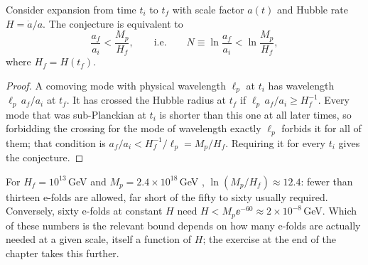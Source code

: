 \begin{proposition}\label{prop:swampland:efolds}
Consider expansion from time $t_i$ to $t_f$ with scale factor $a(t)$ and Hubble rate $H=\dot a/a$.
The conjecture is equivalent to
\begin{equation}\label{eq:swampland:tcc}
\frac{a_f}{a_i}<\frac{M_p}{H_f},\qquad\text{i.e.}\qquad
N\equiv\ln\frac{a_f}{a_i}<\ln\frac{M_p}{H_f},
\end{equation}
where $H_f=H(t_f)$.
\end{proposition}
\begin{proof}
A comoving mode with physical wavelength $\ell_p$ at $t_i$ has wavelength $\ell_p\,a_f/a_i$ at
$t_f$. It has crossed the Hubble radius at $t_f$ if $\ell_p\,a_f/a_i\ge H_f^{-1}$. Every mode
that was sub-Planckian at $t_i$ is shorter than this one at all later times, so forbidding the
crossing for the mode of wavelength exactly $\ell_p$ forbids it for all of them; that condition
is $a_f/a_i<H_f^{-1}/\ell_p=M_p/H_f$. Requiring it for every $t_i$ gives the conjecture.
\end{proof}

\begin{example}
For $H_f=10^{13}\,$GeV and $M_p=2.4\times10^{18}\,$GeV ,
$\ln(M_p/H_f)\approx12.4$: fewer than thirteen e-folds are allowed, far short of the fifty to
sixty usually required. Conversely, sixty e-folds at constant $H$ need
$H<M_p\ee^{-60}\approx2\times10^{-8}\,$GeV.
Which of these numbers is the relevant bound depends on how many e-folds are actually needed at a
given scale, itself a function of $H$; the exercise at the end of the chapter takes this further.
\end{example}

